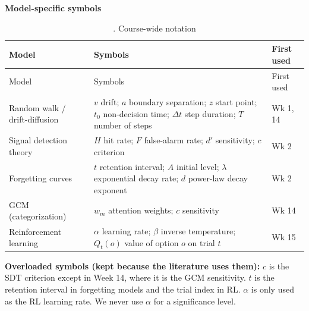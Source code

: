 \textbf{Model-specific symbols}

\begin{longtable}[]{@{}
  >{\raggedright\arraybackslash}p{}
  >{\raggedright\arraybackslash}p{}
  >{\raggedright\arraybackslash}p{}@{}}
\caption{. Course-wide notation}\tabularnewline
\toprule\noalign{}
\begin{minipage}[b]{\linewidth}\raggedright
Model
\end{minipage} & \begin{minipage}[b]{\linewidth}\raggedright
Symbols
\end{minipage} & \begin{minipage}[b]{\linewidth}\raggedright
First used
\end{minipage} \\
\midrule\noalign{}
\endfirsthead
\toprule\noalign{}
\begin{minipage}[b]{\linewidth}\raggedright
Model
\end{minipage} & \begin{minipage}[b]{\linewidth}\raggedright
Symbols
\end{minipage} & \begin{minipage}[b]{\linewidth}\raggedright
First used
\end{minipage} \\
\midrule\noalign{}
\endhead
\bottomrule\noalign{}
\endlastfoot
Random walk / drift-diffusion & \(v\) drift; \(a\) boundary separation;
\(z\) start point; \(t_0\) non-decision time; \(\Delta t\) step
duration; \(T\) number of steps & Wk 1, 14 \\
Signal detection theory & \(H\) hit rate; \(F\) false-alarm rate; \(d'\)
sensitivity; \(c\) criterion & Wk 2 \\
Forgetting curves & \(t\) retention interval; \(A\) initial level;
\(\lambda\) exponential decay rate; \(d\) power-law decay exponent & Wk
2 \\
GCM (categorization) & \(w_m\) attention weights; \(c\) sensitivity & Wk
14 \\
Reinforcement learning & \(\alpha\) learning rate; \(\beta\) inverse
temperature; \(Q_t(o)\) value of option \(o\) on trial \(t\) & Wk 15 \\
\end{longtable}

\textbf{Overloaded symbols (kept because the literature uses them):}
\(c\) is the SDT criterion except in Week 14, where it is the GCM
sensitivity. \(t\) is the retention interval in forgetting models and
the trial index in RL. \(\alpha\) is only used as the RL learning rate.
We never use \(\alpha\) for a significance level.

